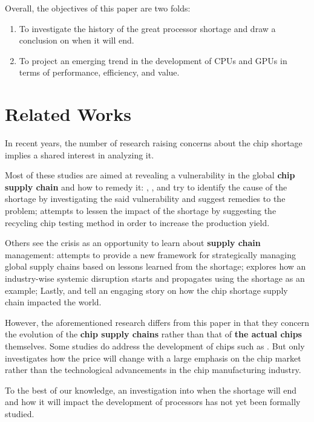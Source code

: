 \documentclass[conference]{IEEEtran}
\begin{document}
Overall, the objectives of this paper are two folds:
\begin{enumerate}
	\item To investigate the history of the great processor shortage and draw a
	      conclusion on when it will end.
	\item To project an emerging trend in the development of CPUs and GPUs in
	      terms of performance, efficiency, and value.
\end{enumerate}

\section{Related Works}\label{RelatedWorks}
In recent years, the number of research raising concerns about the chip
shortage implies a shared interest in analyzing it.

Most of these studies are aimed at revealing a vulnerability in the
global \textbf{chip supply chain} and how to remedy it: \cite{Hannah:2021},
\cite{Xiling:2021}, and \cite{Wassen:2022} try to identify the cause
of the shortage by investigating the said vulnerability and suggest
remedies to the problem; \cite{Yeh:2022} attempts to lessen the impact of
the shortage by suggesting the recycling chip testing method in order to
increase the production yield.

Others see the crisis as an opportunity to learn about \textbf{supply chain}
management: \cite{Jennifer:2022} attempts to provide a new framework for
strategically managing global supply chains based on lessons learned from the
shortage; \cite{Vinay:2022} explores how an industry-wise systemic
disruption starts and propagates using the shortage as an example;
Lastly, \cite{Duncan:2022} and \cite{Kristin:2022} tell an engaging story
on how the chip shortage supply chain impacted the world.

However, the aforementioned research differs from this paper in that they
concern the evolution of the \textbf{chip supply chains} rather than that of
\textbf{the actual chips} themselves. Some studies do address the
development of chips such as \cite{Stephen:2021}. But \cite{Stephen:2021}
only investigates how the price will change with a large emphasis on the
chip market rather than the technological advancements in the chip
manufacturing industry.

To the
best of our knowledge, an investigation into when the shortage will end and how
it will impact the development of processors has not yet been formally
studied.
\end{document}
